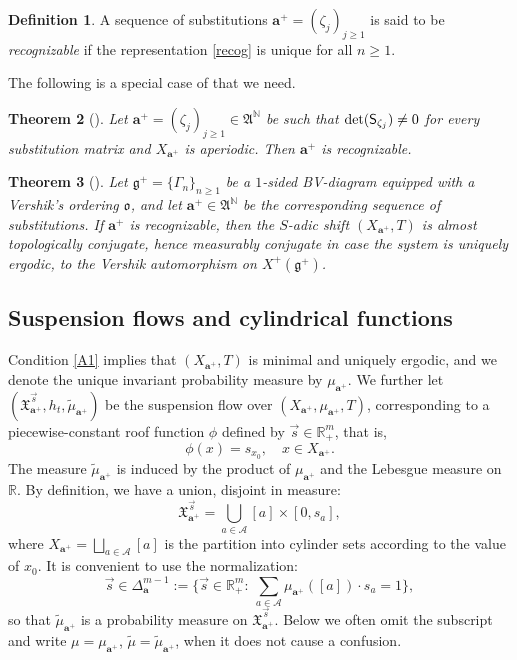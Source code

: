 \documentclass[11pt]{article}
\numberwithin{equation}{section}\newcommand{\Relation}[2][]{}\newtheorem*{prop*}{Proposition}
\let\mathcal\mathscr
\theoremstyle{plain}
\newtheorem{theorem}{Theorem}[section]
\theoremstyle{definition}
\newtheorem{defi}[theorem]{Definition}
\let\wt\widetilde
\newcommand\bom{{\boldsymbol a}}\let\ba\bom
\let\Gam\Gamma
\newcommand\gf{\mathfrak{g}}
\newcommand\ok{\mathfrak{o}}
\newcommand\FrA{\mathfrak{A}}
\newcommand\Xx{\mathfrak{X}}
\newcommand\Ak{\mathcal{A}}
\newcommand{\R}{\mathbb{R}}
\newcommand{\N}{\mathbb{N}}
\newcommand\Sf{{\sf S}}
\begin{document}
\begin{defi} \label{def-recog}
A sequence of substitutions $\ba^+ = (\zeta_j)_{j\ge 1}$ is said to be \emph{recognizable} if the representation \eqref{recog} is unique for all $n\ge 1$.
\end{defi}

The following is a special case of \cite[Th.\,4.6]{BSTY} that we need.

\begin{theorem}[{\cite{BSTY}}] \label{th-recog0}
Let $\ba^+= (\zeta_j)_{j\ge 1} \in \FrA^\N$ be such that $\det(\Sf_{\zeta_j})\ne 0$ for every substitution matrix and $X_{\ba^+}$ is aperiodic. Then $\ba^+$ is recognizable.
\end{theorem}

\begin{theorem}[{\cite[Th.\,6.5]{BSTY}}] \label{thm-recog}
Let $\gf^+=\{\Gam_n\}_{n\ge 1}$ be a $1$-sided BV-diagram equipped with a Vershik's ordering $\ok$, and let $\ba^+\in \FrA^\N$ be the corresponding sequence of substitutions.
If $\ba^+$ is recognizable, then the $S$-adic shift $(X_{\ba^+},T)$ is almost topologically conjugate, hence measurably conjugate in case the system is uniquely ergodic, to the
Vershik automorphism on $X^+(\gf^+)$.
\end{theorem}

\subsection{Suspension flows and cylindrical functions}
Condition \eqref{A1} implies that $(X_{\ba^+},T)$ is minimal and uniquely ergodic, and we
denote the unique invariant probability measure by $\mu_{\bom^+}$.
We further let
$(\Xx_{\ba^+}^{\vec{s}}, h_t, \wt{\mu}_{\bom^+})$ be the suspension flow over $(X_{\ba^+},\mu_{\bom^+}, T)$, corresponding to a piecewise-constant roof function $\phi$ defined by \hbox{$\vec{s}\in \R^m_+$}, that is,
\[
\phi(x) = s_{x_0},\quad x\in X_{\ba^+}.
\]
The measure $\wt\mu_{\bom^+}$ is induced by the product of $\mu_{\bom^+}$ and the Lebesgue measure on $\R$.
By definition, we have a union, disjoint in measure:
\[
\Xx_{\ba^+}^{\vec{s}} = \bigcup_{a\in \Ak} [a]\times [0,s_a],
\]
where $X_{\ba^+} = \bigsqcup_{a\in \Ak} [a] $ is the partition into cylinder sets according to the value of $x_0$. It is convenient to use the normalization:
\[\textstyle
\vec{s} \in \Delta^{m-1}_\bom:= \bigl\{\vec s\in \R^m_+: \ \sum_{a\in \Ak} \mu_{\bom^+}([a]) \cdot s_a = 1\bigr\},
\]
so that $\wt \mu_{\bom^+}$ is a probability measure on $\Xx_{\ba^+}^{\vec{s}}$. Below we often omit the subscript and write $\mu = \mu_{\bom^+}$, $\wt\mu = \wt\mu_{\bom^+}$,
when it does not cause a confusion.
\end{document}
